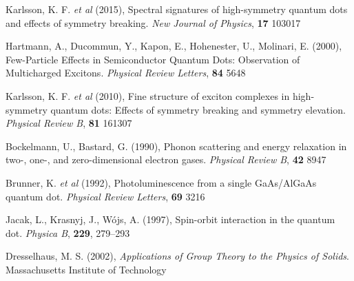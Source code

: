 \documentclass[12pt]{article}
\begin{document}
\begin{thebibliography}{10}
Karlsson, K. F. \textit{et al} (2015), Spectral signatures of high-symmetry quantum dots and effects of symmetry breaking. \textit{New Journal of Physics}, \textbf{17} 103017

Hartmann, A., Ducommun, Y., Kapon, E., Hohenester, U., Molinari, E. (2000), Few-Particle Effects in Semiconductor Quantum Dots: Observation of Multicharged Excitons. \textit{Physical Review Letters}, \textbf{84} 5648

Karlsson, K. F. \textit{et al} (2010), Fine structure of exciton complexes in high-symmetry quantum dots: Effects of symmetry breaking and symmetry elevation. \textit{Physical Review B}, \textbf{81} 161307

Bockelmann, U., Bastard, G. (1990), Phonon scattering and energy relaxation in two-, one-, and zero-dimensional electron gases. \textit{Physical Review B}, \textbf{42} 8947

Brunner, K. \textit{et al} (1992), Photoluminescence from a single GaAs/AlGaAs quantum dot. \textit{Physical Review Letters}, \textbf{69} 3216

Jacak, L., Krasnyj, J., Wójs, A. (1997), Spin-orbit interaction in the quantum dot. \textit{Physica B}, \textbf{229}, 279--293

Dresselhaus, M. S. (2002), \textit{Applications of Group Theory to the Physics of Solids}. Massachusetts Institute of Technology


\end{thebibliography}



%





\end{document}
